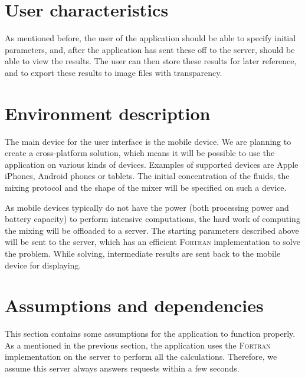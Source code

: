 \section{User characteristics}
As mentioned before, the user of the application should be able to specify initial parameters, and, after the application has sent these off to the server, should be able to view the results. The user can then store these results for later reference, and to export these results to image files with transparency.

\section{Environment description}
The main device for the user interface is the mobile device. We are planning to create a cross-platform solution, which means it will be possible to use the application on various kinds of devices. Examples of supported devices are Apple iPhones, Android phones or tablets. The initial concentration of the fluids, the mixing protocol and the shape of the mixer will be specified on such a device.

As mobile devices typically do not have the power (both processing power and battery capacity) to perform intensive computations, the hard work of computing the mixing will be offloaded to a server. The starting parameters described above will be sent to the server, which has an efficient \textsc{Fortran} implementation to solve the problem. While solving, intermediate results are sent back to the mobile device for displaying.

\section{Assumptions and dependencies}
This section contains some assumptions for the application to function properly.\\
As a mentioned in the previous section, the application uses the \textsc{Fortran} implementation on the server to perform all the calculations. Therefore, we assume this server always answers requests within a few seconds.
